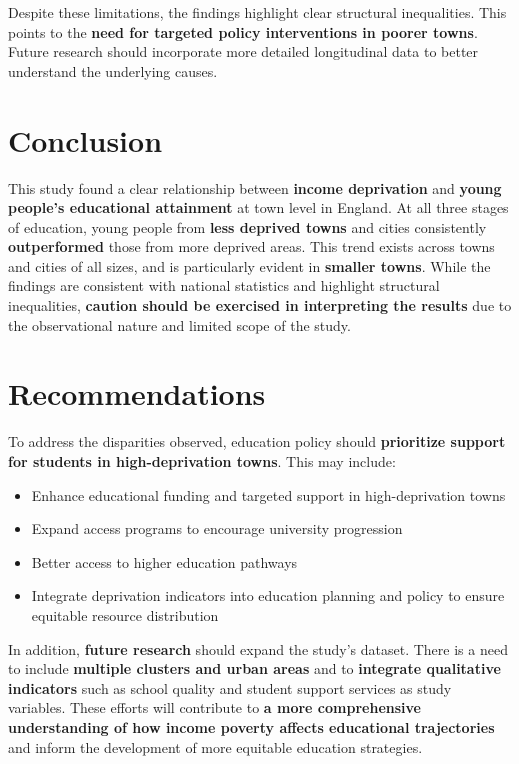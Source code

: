 \documentclass[11pt,en]{../tex/elegantpaper}
\begin{document}
Despite these limitations, the findings highlight clear structural
inequalities. This points to the \textbf{need for targeted policy
interventions in poorer towns}. Future research should incorporate more
detailed longitudinal data to better understand the underlying causes.

\section{Conclusion}\label{conclusion}

This study found a clear relationship between \textbf{income
deprivation} and \textbf{young people's educational attainment} at town
level in England. At all three stages of education, young people from
\textbf{less deprived towns} and cities consistently
\textbf{outperformed} those from more deprived areas. This trend exists
across towns and cities of all sizes, and is particularly evident in
\textbf{smaller towns}. While the findings are consistent with national
statistics and highlight structural inequalities, \textbf{caution should
be exercised in interpreting the results} due to the observational
nature and limited scope of the study.

\section{Recommendations}\label{recommendations}

To address the disparities observed, education policy should
\textbf{prioritize support for students in high-deprivation towns}. This
may include:

\begin{itemize}
\item
  Enhance educational funding and targeted support in high-deprivation
  towns
\item
  Expand access programs to encourage university progression
\item
  Better access to higher education pathways
\item
  Integrate deprivation indicators into education planning and policy to
  ensure equitable resource distribution
\end{itemize}

In addition, \textbf{future research} should expand the study's dataset.
There is a need to include \textbf{multiple clusters and urban areas}
and to \textbf{integrate qualitative indicators} such as school quality
and student support services as study variables. These efforts will
contribute to \textbf{a more comprehensive understanding of how income
poverty affects educational trajectories} and inform the development of
more equitable education strategies.
\end{document}
